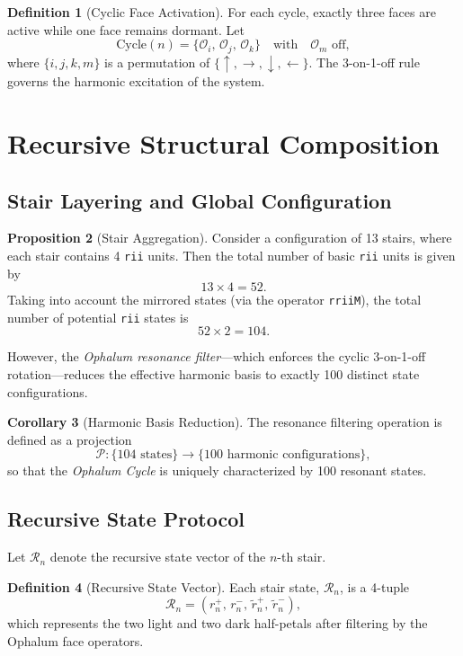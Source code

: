 \documentclass[12pt]{article}
\theoremstyle{definition}
\newtheorem{definition}{Definition}[section]
\newtheorem{proposition}[definition]{Proposition}
\newtheorem{corollary}[definition]{Corollary}
\begin{document}
\begin{definition}[Cyclic Face Activation]
For each cycle, exactly three faces are active while one face remains dormant. Let
\[ \text{Cycle}(n) = \{ \mathcal{O}_{i},\, \mathcal{O}_{j},\, \mathcal{O}_{k} \} \quad \text{with} \quad \mathcal{O}_{m} \text{ off}, \]
where $\{i,j,k,m\}$ is a permutation of $\{\uparrow,\rightarrow,\downarrow,\leftarrow\}$. The 3-on-1-off rule governs the harmonic excitation of the system.
\end{definition}

\section{Recursive Structural Composition}

\subsection{Stair Layering and Global Configuration}

\begin{proposition}[Stair Aggregation]
Consider a configuration of 13 stairs, where each stair contains 4 \texttt{rii} units. Then the total number of basic \texttt{rii} units is given by
\[ 13 \times 4 = 52. \]
Taking into account the mirrored states (via the operator \texttt{rriiM}), the total number of potential \texttt{rii} states is
\[ 52 \times 2 = 104. \]
\end{proposition}

However, the \emph{Ophalum resonance filter}—which enforces the cyclic 3-on-1-off rotation—reduces the effective harmonic basis to exactly 100 distinct state configurations.

\begin{corollary}[Harmonic Basis Reduction]
The resonance filtering operation is defined as a projection
\[ \mathcal{P} : \{104 \text{ states}\} \to \{100 \text{ harmonic configurations}\}, \]
so that the \emph{Ophalum Cycle} is uniquely characterized by 100 resonant states.
\end{corollary}

\subsection{Recursive State Protocol}

Let $\mathcal{R}_n$ denote the recursive state vector of the $n$-th stair.

\begin{definition}[Recursive State Vector]
Each stair state, $\mathcal{R}_n$, is a 4-tuple
\[ \mathcal{R}_n = \left( r_n^+,\, r_n^-,\, \tilde{r}_n^+,\, \tilde{r}_n^- \right), \]
which represents the two light and two dark half-petals after filtering by the Ophalum face operators.
\end{definition}
\end{document}
